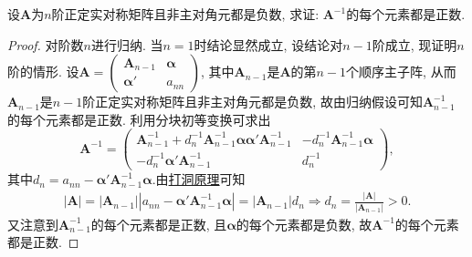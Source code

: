 \documentclass[../../main.tex]{subfiles}%
\begin{document}
\begin{example}
设$\boldsymbol{A}$为$n$阶正定实对称矩阵且非主对角元都是负数, 求证: $\boldsymbol{A}^{-1}$的每个元素都是正数.
\end{example}
\begin{proof}
对阶数$n$进行归纳. 当$n = 1$时结论显然成立, 设结论对$n - 1$阶成立, 现证明$n$阶的情形. 设$\boldsymbol{A}=\begin{pmatrix}
\boldsymbol{A}_{n - 1} & \boldsymbol{\alpha} \\
\boldsymbol{\alpha}' & a_{nn}
\end{pmatrix}$, 其中$\boldsymbol{A}_{n - 1}$是$\boldsymbol{A}$的第$n - 1$个顺序主子阵, 从而$\boldsymbol{A}_{n - 1}$是$n - 1$阶正定实对称矩阵且非主对角元都是负数, 故由归纳假设可知$\boldsymbol{A}_{n - 1}^{-1}$的每个元素都是正数. 利用分块初等变换可求出
\[
\boldsymbol{A}^{-1}=\begin{pmatrix}
\boldsymbol{A}_{n - 1}^{-1}+d_n^{-1}\boldsymbol{A}_{n - 1}^{-1}\boldsymbol{\alpha}\boldsymbol{\alpha}'\boldsymbol{A}_{n - 1}^{-1} & -d_n^{-1}\boldsymbol{A}_{n - 1}^{-1}\boldsymbol{\alpha} \\
-d_n^{-1}\boldsymbol{\alpha}'\boldsymbol{A}_{n - 1}^{-1} & d_n^{-1}
\end{pmatrix},
\]
其中$d_n = a_{nn}-\boldsymbol{\alpha}'\boldsymbol{A}_{n - 1}^{-1}\boldsymbol{\alpha}$.由\hyperref[proposition:打洞原理]{打洞原理}可知
\begin{align*}
|\boldsymbol{A}|=\left| \boldsymbol{A}_{n-1} \right|\left| a_{nn}-\boldsymbol{\alpha }' \boldsymbol{A}_{n-1}^{-1}\boldsymbol{\alpha } \right|=\left| \boldsymbol{A}_{n-1} \right|d_n\Rightarrow d_n=\frac{|\boldsymbol{A}|}{|\boldsymbol{A}_{n-1}|}>0.
\end{align*}
又注意到$\boldsymbol{A}_{n - 1}^{-1}$的每个元素都是正数, 且$\boldsymbol{\alpha}$的每个元素都是负数, 故$\boldsymbol{A}^{-1}$的每个元素都是正数. 
\end{proof}
\end{document}
